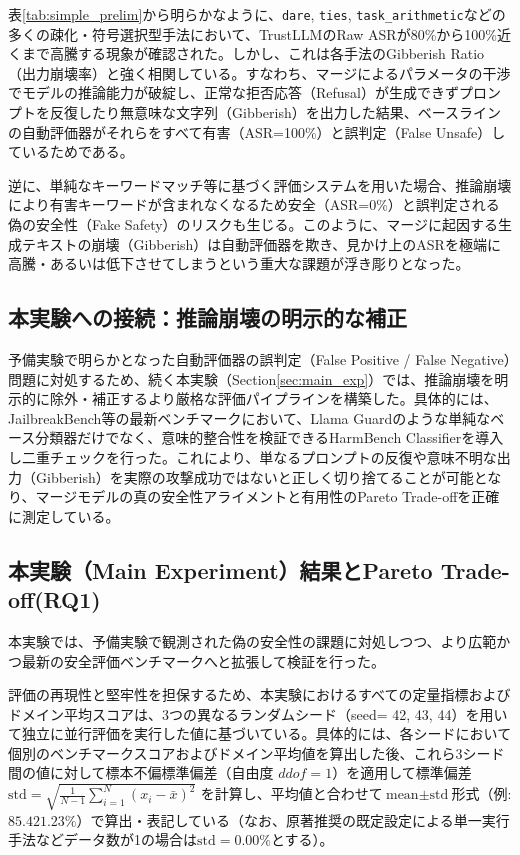 \documentclass{article}
\begin{document}
表\ref{tab:simple_prelim}から明らかなように、\texttt{dare}, \texttt{ties}, \texttt{task\_arithmetic}などの多くの疎化・符号選択型手法において、TrustLLMのRaw ASRが80\%から100\%近くまで高騰する現象が確認された。しかし、これは各手法のGibberish Ratio（出力崩壊率）と強く相関している。すなわち、マージによるパラメータの干渉でモデルの推論能力が破綻し、正常な拒否応答（Refusal）が生成できずプロンプトを反復したり無意味な文字列（Gibberish）を出力した結果、ベースラインの自動評価器がそれらをすべて有害（ASR=100\%）と誤判定（False Unsafe）しているためである。

逆に、単純なキーワードマッチ等に基づく評価システムを用いた場合、推論崩壊により有害キーワードが含まれなくなるため安全（ASR=0\%）と誤判定される偽の安全性（Fake Safety）のリスクも生じる。このように、マージに起因する生成テキストの崩壊（Gibberish）は自動評価器を欺き、見かけ上のASRを極端に高騰・あるいは低下させてしまうという重大な課題が浮き彫りとなった。

\subsection{本実験への接続：推論崩壊の明示的な補正}
予備実験で明らかとなった自動評価器の誤判定（False Positive / False Negative）問題に対処するため、続く本実験（Section\ref{sec:main_exp}）では、推論崩壊を明示的に除外・補正するより厳格な評価パイプラインを構築した。具体的には、JailbreakBench等の最新ベンチマークにおいて、Llama Guardのような単純なベース分類器だけでなく、意味的整合性を検証できるHarmBench Classifierを導入し二重チェックを行った。これにより、単なるプロンプトの反復や意味不明な出力（Gibberish）を実際の攻撃成功ではないと正しく切り捨てることが可能となり、マージモデルの真の安全性アライメントと有用性のPareto Trade-offを正確に測定している。

\subsection{本実験（Main Experiment）結果とPareto Trade-off(RQ1)}
本実験では、予備実験で観測された偽の安全性の課題に対処しつつ、より広範かつ最新の安全評価ベンチマークへと拡張して検証を行った。

評価の再現性と堅牢性を担保するため、本実験におけるすべての定量指標およびドメイン平均スコアは、3つの異なるランダムシード（seed= 42, 43, 44）を用いて独立に並行評価を実行した値に基づいている。具体的には、各シードにおいて個別のベンチマークスコアおよびドメイン平均値を算出した後、これら3シード間の値に対して標本不偏標準偏差（自由度 $ddof=1$）を適用して標準偏差$\text{std} = \sqrt{\frac{1}{N-1}\sum_{i=1}^{N}(x_i - \bar{x})^2}$ を計算し、平均値と合わせて$\text{mean} \pm \text{std}$形式（例:$85.42 $\pm$ 1.23\%$）で算出・表記している（なお、原著推奨の既定設定による単一実行手法などデータ数が1の場合は$\text{std}=0.00\%$とする）。
\end{document}
